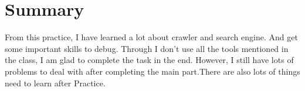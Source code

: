 \documentclass[a4paper]{article}
\begin{document}
\section{Summary} 
From this practice, I have learned a lot about crawler and search engine. And get some important skills to debug. Through I don't use all the tools mentioned in the class, I am glad to complete the task in the end. However, I still have lots of problems to deal with after completing the main part.There are also lots of things need to learn after Practice.
 
\end{document}
